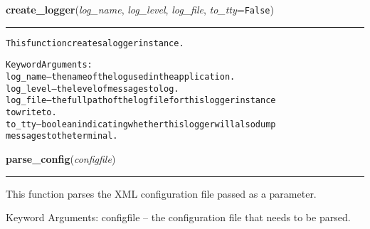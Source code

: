     \vspace{0.5ex}

\hspace{.8\funcindent}\begin{boxedminipage}{\funcwidth}

    \raggedright \textbf{create\_logger}(\textit{log\_name}, \textit{log\_level}, \textit{log\_file}, \textit{to\_tty}={\tt False})

    \vspace{-1.5ex}

    \rule{\textwidth}{0.5\fboxrule}
\setlength{\parskip}{2ex}
\begin{alltt}
This function creates a logger instance.

Keyword Arguments:
log\_name  -- the name of the log used in the application.
log\_level -- the level of messages to log.
log\_file  -- the full path of the log file for this logger instance
             to write to.
to\_tty    -- boolean indicating whether this logger will also dump
             messages to the terminal.
\end{alltt}

\setlength{\parskip}{1ex}
    \end{boxedminipage}

    \label{reliafree:utilities:parse_config}

    \vspace{0.5ex}

\hspace{.8\funcindent}\begin{boxedminipage}{\funcwidth}

    \raggedright \textbf{parse\_config}(\textit{configfile})

    \vspace{-1.5ex}

    \rule{\textwidth}{0.5\fboxrule}
\setlength{\parskip}{2ex}
    This function parses the XML configuration file passed as a parameter.

    Keyword Arguments: configfile -- the configuration file that needs to 
    be parsed.

\setlength{\parskip}{1ex}
    \end{boxedminipage}

    \label{reliafree:utilities:split_string}


